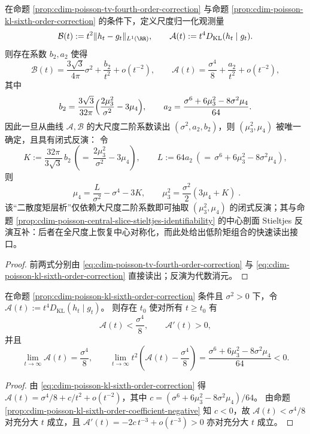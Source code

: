 \begin{proposition}\label{prop:cdim-poisson-two-divergence-moment-tomography}
在命题 \ref{prop:cdim-poisson-tv-fourth-order-correction} 与命题 \ref{prop:cdim-poisson-kl-sixth-order-correction} 的条件下，定义尺度归一化观测量
\[
\mathcal B(t):=t^2\|h_t-g_t\|_{L^1(\RR)},
\qquad
\mathcal A(t):=t^4D_{\mathrm{KL}}(h_t\mid g_t).
\]
则存在系数 \(b_2,a_2\) 使得
\[
\mathcal B(t)=\frac{3\sqrt3}{4\pi}\sigma^2+\frac{b_2}{t^2}+o(t^{-2}),
\qquad
\mathcal A(t)=\frac{\sigma^4}{8}+\frac{a_2}{t^2}+o(t^{-2}),
\]
其中
\[
b_2=\frac{3\sqrt3}{32\pi}\Bigl(\frac{2\mu_3^2}{\sigma^2}-3\mu_4\Bigr),
\qquad
a_2=\frac{\sigma^6+6\mu_3^2-8\sigma^2\mu_4}{64}.
\]
因此一旦从曲线 \(\mathcal A,\mathcal B\) 的大尺度二阶系数读出 \((\sigma^2,a_2,b_2)\)，则 \((\mu_3^2,\mu_4)\) 被唯一确定，且具有闭式反演：
令
\[
K:=\frac{32\pi}{3\sqrt3}\,b_2\ (=\,\frac{2\mu_3^2}{\sigma^2}-3\mu_4),
\qquad
L:=64a_2\ (=\,\sigma^6+6\mu_3^2-8\sigma^2\mu_4),
\]
则
\begin{equation}\label{eq:cdim-poisson-two-divergence-moment-tomography-inversion}
\boxed{\;
\mu_4=\frac{L}{\sigma^2}-\sigma^4-3K,
\qquad
\mu_3^2=\frac{\sigma^2}{2}(3\mu_4+K)\; }.
\end{equation}
该“二散度矩层析”仅依赖大尺度二阶系数即可抽取 \((\mu_3^2,\mu_4)\) 的闭式反演；其与命题 \ref{prop:cdim-poisson-central-slice-stieltjes-identifiability} 的中心剖面 Stieltjes 反演互补：后者在全尺度上恢复中心对称化，而此处给出低阶矩组合的快速读出接口。
\end{proposition}
\begin{proof}
前两式分别由 \eqref{eq:cdim-poisson-tv-fourth-order-correction} 与 \eqref{eq:cdim-poisson-kl-sixth-order-correction} 直接读出；反演为代数消元。
\end{proof}

\begin{corollary}\label{cor:cdim-poisson-normalized-kl-eventual-monotone}
在命题 \ref{prop:cdim-poisson-kl-sixth-order-correction} 条件且 \(\sigma^2>0\) 下，令
\(
\mathcal A(t):=t^4D_{\mathrm{KL}}(h_t\mid g_t)
\)。
则存在 \(t_0\) 使对所有 \(t\ge t_0\) 有
\[
\mathcal A(t)<\frac{\sigma^4}{8},
\qquad
\mathcal A'(t)>0,
\]
并且
\[
\lim_{t\to\infty}\mathcal A(t)=\frac{\sigma^4}{8},
\qquad
\lim_{t\to\infty}t^2\left(\mathcal A(t)-\frac{\sigma^4}{8}\right)
=\frac{\sigma^6+6\mu_3^2-8\sigma^2\mu_4}{64}<0.
\]
\end{corollary}
\begin{proof}
由 \eqref{eq:cdim-poisson-kl-sixth-order-correction} 得
\(
\mathcal A(t)=\sigma^4/8+c/t^2+o(t^{-2})
\)，其中 \(c=(\sigma^6+6\mu_3^2-8\sigma^2\mu_4)/64\)。
由命题 \ref{prop:cdim-poisson-kl-sixth-order-coefficient-negative} 知 \(c<0\)，故 \(\mathcal A(t)<\sigma^4/8\) 对充分大 \(t\) 成立，且
\(
\mathcal A'(t)=-2c\,t^{-3}+o(t^{-3})>0
\)
亦对充分大 \(t\) 成立。
\end{proof}

